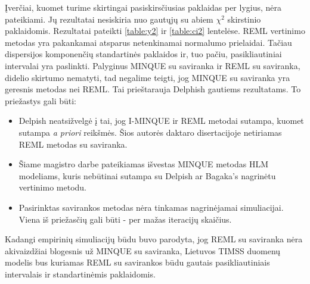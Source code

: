 \documentclass[12pt,a4paper]{article}
\begin{document}
\indent Įverčiai, kuomet turime skirtingai pasiskirsčiusias paklaidas per lygius, nėra pateikiami. Jų rezultatai nesiskiria nuo gautųjų su abiem $\chi^2$ skirstinio paklaidomis. Rezultatai pateikti \ref{table:y2} ir \ref{table:ci2} lentelėse. REML vertinimo metodas yra pakankamai atsparus netenkinamai normalumo prielaidai. Tačiau dispersijos komponenčių standartinės paklaidos ir, tuo pačiu, pasikliautiniai intervalai yra paslinkti. Palyginus MINQUE su saviranka ir REML su saviranka, didelio skirtumo nematyti, tad negalime teigti, jog MINQUE su saviranka yra geresnis metodas nei REML. Tai prieštarauja Delphish gautiems rezultatams. To priežastys gali būti:
\begin{itemize}
\item Delpish neatsižvelgė į tai, jog I-MINQUE ir REML metodai sutampa, kuomet sutampa \textit{a priori} reikšmės. Šios autorės daktaro disertacijoje netiriamas REML metodas su saviranka.
\item Šiame magistro darbe pateikiamas išvestas MINQUE metodas HLM modeliams, kuris nebūtinai sutampa su Delpish ar Bagaka's nagrinėtu vertinimo metodu.
\item Pasirinktas savirankos metodas nėra tinkamas nagrinėjamai simuliacijai. Viena iš priežasčių gali būti - per mažas iteracijų skaičius.
\end{itemize}

\indent Kadangi empirinių simuliacijų būdu buvo parodyta, jog REML su saviranka nėra akivaizdžiai blogesnis už MINQUE su saviranka, Lietuvos TIMSS duomenų modelis bus kuriamas REML su savirankos būdu gautais pasikliautiniais intervalais ir standartinėmis paklaidomis.
\end{document}
